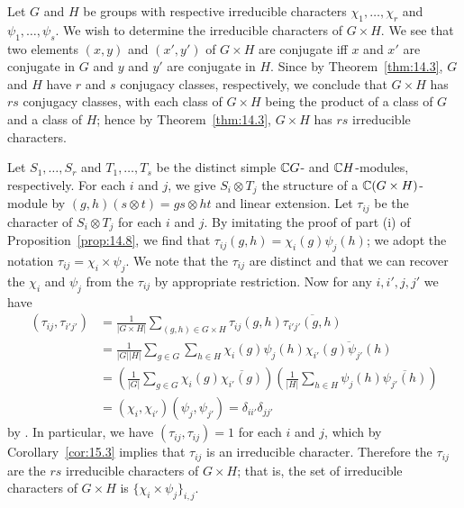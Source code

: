 \documentclass[../Odyssey_Project.tex]{subfiles}
\begin{document}
\begin{example}
\label{ex:15.eg.2}
Let $G$ and $H$ be groups with respective irreducible characters $\chi_1, \ldots, \chi_r$ and $\psi_1, \ldots, \psi_s$. We wish to determine the irreducible characters of $G \times H$. We see that two elements $(x, y)$ and $(x', y')$ of $G \times H$ are conjugate iff $x$ and $x'$ are conjugate in $G$ and $y$ and $y'$ are conjugate in $H$. Since by Theorem~\ref{thm:14.3}, $G$ and $H$ have $r$ and $s$ conjugacy classes, respectively, we conclude that $G \times H$ has $rs$ conjugacy classes, with each class of $G \times H$ being the product of a class of $G$ and a class of $H$; hence by Theorem~\ref{thm:14.3}, $G \times H$ has $rs$ irreducible characters.

Let $S_1, \ldots, S_r$ and $T_1, \ldots, T_s$ be the distinct simple $\mathbb{C} G$- and $\mathbb{C} H$-modules, respectively. For each $i$ and $j$, we give $S_i \otimes T_j$ the structure of a $\mathbb{C}(G \times H)$-module by $(g, h)(s \otimes t) = gs \otimes ht$ and linear extension. Let $\tau_{ij}$ be the character of $S_i \otimes T_j$ for each $i$ and $j$. By imitating the proof of part (i) of Proposition~\ref{prop:14.8}, we find that $\tau_{ij}(g, h) = \chi_i(g)\psi_j(h)$; we adopt the notation $\tau_{ij} = \chi_i \times \psi_j$. We note that the $\tau_{ij}$ are distinct and that we can recover the $\chi_i$ and $\psi_j$ from the $\tau_{ij}$ by appropriate restriction. Now for any $i, i', j, j'$ we have
\begin{align*}
    (\tau_{ij}, \tau_{i'j'}) &= \frac{1}{|G \times H|} \sum_{(g,h) \in G \times H} \tau_{ij}(g,h)\overline{\tau_{i'j'}(g,h)} \\
    &= \frac{1}{|G||H|} \sum_{g \in G} \sum_{h \in H} \chi_i(g)\psi_j(h)\overline{\chi_{i'}(g)\psi_{j'}(h)} \\
    &= \left(\frac{1}{|G|} \sum_{g \in G} \chi_i(g)\overline{\chi_{i'}(g)}\right)\left(\frac{1}{|H|} \sum_{h \in H} \psi_j(h)\overline{\psi_{j'}(h)}\right) \\
    &= (\chi_i, \chi_{i'})(\psi_j, \psi_{j'}) = \delta_{ii'}\delta_{jj'}
\end{align*}
by . In particular, we have $(\tau_{ij}, \tau_{ij}) = 1$ for each $i$ and $j$, which by Corollary~\ref{cor:15.3} implies that $\tau_{ij}$ is an irreducible character. Therefore the $\tau_{ij}$ are the $rs$ irreducible characters of $G \times H$; that is, the set of irreducible characters of $G \times H$ is $\{\chi_i \times \psi_j\}_{i,j}$.
\end{example}
\end{document}
